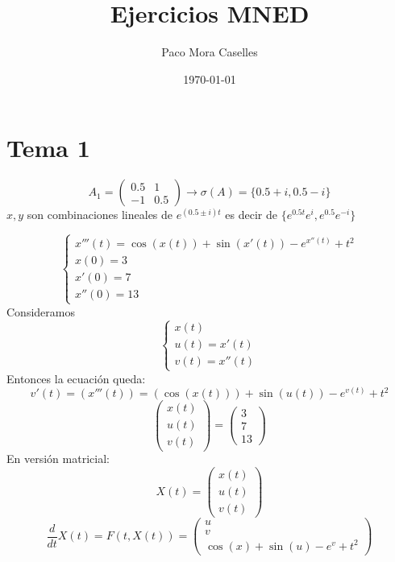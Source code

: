 \documentclass[openany]{book}
\title{Ejercicios MNED}
\author{Paco Mora Caselles}
\date{\today}
\begin{document}
    \maketitle
    \chapter{Tema 1}


    \begin{exercise}
        $$ A_1 = \begin{pmatrix} 0.5 & 1 \\ -1 & 0.5 \end{pmatrix} \to \sigma(A) = \{0.5+i,0.5-i\} $$
        $ x,y $ son combinaciones lineales de $ e^{(0.5\pm i)t} $ es decir de $ \{e^{0.5t}e^{i},e^{0.5}e^{-i}\} $
    \end{exercise}

    \setcounter{ex}{4}
    \begin{exercise}
        $$ 
        \left\{
        \begin{array}{l}
            x'''(t) = \cos(x(t))+ \sin(x'(t)) - e^{x''(t)}+t^2\\
            x(0) = 3\\
            x'(0) = 7\\
            x''(0) = 13
        \end{array}
        \right.
        $$
        Consideramos 
        $$ 
        \left\{
        \begin{array}{l}
            x(t)\\
            u(t) = x'(t)\\
            v(t) = x''(t)
        \end{array}
        \right.
        $$
        Entonces la ecuación queda:
        $$ v'(t) = (x'''(t)) = (\cos(x(t)))+\sin(u(t))-e^{v(t)}+t^2 $$
        $$ \begin{pmatrix} x(t)\\u(t)\\v(t) \end{pmatrix} = \begin{pmatrix} 3 \\ 7 \\13 \end{pmatrix}  $$
        En versión matricial:
        $$ X(t) = \begin{pmatrix} x(t)\\u(t)\\v(t) \end{pmatrix}  $$
        $$ \dfrac{d}{dt} X(t) = F(t,X(t)) = \begin{pmatrix} u \\ v \\ \cos(x)+\sin(u)-e^{v}+t^2 \end{pmatrix}  $$
    \end{exercise}
\end{document}
